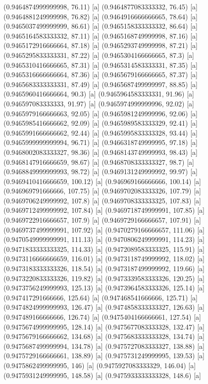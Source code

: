 {{{(0.9464874999999998, 76.11) [a] 
(0.9464877083333332, 76.45) [a] 
(0.9464881249999998, 76.82) [a] 
(0.9464916666666665, 78.64) [a] 
(0.9465037499999999, 86.61) [a] 
(0.9465158333333332, 86.64) [a] 
(0.9465164583333332, 87.11) [a] 
(0.9465168749999998, 87.16) [a] 
(0.9465172916666664, 87.18) [a] 
(0.9465293749999998, 87.21) [a] 
(0.9465295833333331, 87.22) [a] 
(0.9465304166666665, 87.3) [a] 
(0.9465310416666665, 87.31) [a] 
(0.9465314583333331, 87.35) [a] 
(0.9465316666666664, 87.36) [a] 
(0.9465679166666665, 87.37) [a] 
(0.9465683333333331, 87.49) [a] 
(0.9465687499999997, 88.85) [a] 
(0.9465960416666664, 90.3) [a] 
(0.9465964583333331, 91.96) [a] 
(0.946597083333333, 91.97) [a] 
(0.9465974999999996, 92.02) [a] 
(0.9465979166666663, 92.05) [a] 
(0.9465981249999996, 92.06) [a] 
(0.9465985416666662, 92.09) [a] 
(0.9465989583333329, 92.41) [a] 
(0.9465991666666662, 92.44) [a] 
(0.9465995833333328, 93.44) [a] 
(0.9465999999999994, 96.71) [a] 
(0.9466318749999995, 97.18) [a] 
(0.9468002083333327, 98.36) [a] 
(0.9468143749999993, 98.43) [a] 
(0.9468147916666659, 98.67) [a] 
(0.9468708333333327, 98.7) [a] 
(0.9468849999999993, 98.72) [a] 
(0.9469131249999992, 99.97) [a] 
(0.9469410416666659, 100.12) [a] 
(0.946969166666666, 100.14) [a] 
(0.946969791666666, 107.75) [a] 
(0.9469702083333326, 107.79) [a] 
(0.9469706249999992, 107.8) [a] 
(0.9469708333333325, 107.83) [a] 
(0.9469712499999992, 107.84) [a] 
(0.9469718749999991, 107.85) [a] 
(0.9469722916666657, 107.9) [a] 
(0.9469729166666657, 107.91) [a] 
(0.9469737499999991, 107.92) [a] 
(0.9470279166666657, 111.06) [a] 
(0.9470549999999991, 111.13) [a] 
(0.9470806249999991, 114.23) [a] 
(0.9471833333333325, 114.33) [a] 
(0.9472089583333325, 115.91) [a] 
(0.9473116666666659, 116.01) [a] 
(0.9473118749999992, 118.02) [a] 
(0.9473183333333326, 118.54) [a] 
(0.9473187499999992, 119.66) [a] 
(0.9473220833333326, 119.82) [a] 
(0.9473339583333326, 120.25) [a] 
(0.9473756249999993, 125.13) [a] 
(0.9473964583333326, 125.14) [a] 
(0.947417291666666, 125.64) [a] 
(0.947468541666666, 125.71) [a] 
(0.9474824999999993, 126.47) [a] 
(0.9474858333333327, 126.63) [a] 
(0.947489166666666, 126.74) [a] 
(0.9475404166666661, 127.54) [a] 
(0.9475674999999995, 128.14) [a] 
(0.9475677083333328, 132.47) [a] 
(0.9475679166666662, 134.68) [a] 
(0.9475683333333328, 134.74) [a] 
(0.9475687499999994, 134.78) [a] 
(0.9475727083333327, 138.88) [a] 
(0.9475729166666661, 138.89) [a] 
(0.9475731249999995, 139.53) [a] 
(0.9475862499999995, 146) [a] 
(0.9475927083333329, 146.04) [a] 
(0.9475931249999995, 148.58) [a] 
(0.9475933333333328, 148.6) [a] 
}}}
